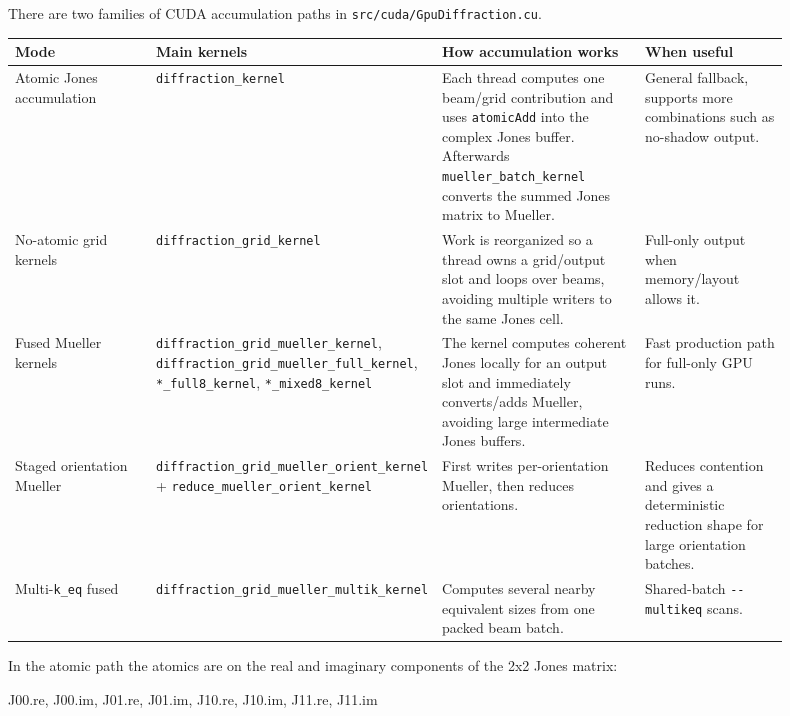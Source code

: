 \documentclass[
  10pt,
  a4paper,
]{article}
\newenvironment{Shaded}{}{}
\newcommand{\NormalTok}[1]{#1}
\begin{document}
There are two families of CUDA accumulation paths in
\texttt{src/cuda/GpuDiffraction.cu}.

\begin{longtable}[]{@{}L{0.20\linewidth}L{0.22\linewidth}L{0.28\linewidth}L{0.20\linewidth}@{}}
\toprule\noalign{}
Mode & Main kernels & How accumulation works & When useful \\
\midrule\noalign{}
\endhead
\bottomrule\noalign{}
\endlastfoot
Atomic Jones accumulation & \nolinkurl{diffraction_kernel} & Each thread
computes one beam/grid contribution and uses \texttt{atomicAdd} into the
complex Jones buffer. Afterwards \nolinkurl{mueller_batch_kernel}
converts the summed Jones matrix to Mueller. & General fallback,
supports more combinations such as no-shadow output. \\
No-atomic grid kernels & \nolinkurl{diffraction_grid_kernel} & Work is
reorganized so a thread owns a grid/output slot and loops over beams,
avoiding multiple writers to the same Jones cell. & Full-only output
when memory/layout allows it. \\
Fused Mueller kernels & \nolinkurl{diffraction_grid_mueller_kernel},
\nolinkurl{diffraction_grid_mueller_full_kernel},
\nolinkurl{*_full8_kernel}, \nolinkurl{*_mixed8_kernel} & The kernel
computes coherent Jones locally for an output slot and immediately
converts/adds Mueller, avoiding large intermediate Jones buffers. & Fast
production path for full-only GPU runs. \\
Staged orientation Mueller &
\nolinkurl{diffraction_grid_mueller_orient_kernel} +
\nolinkurl{reduce_mueller_orient_kernel} & First writes per-orientation
Mueller, then reduces orientations. & Reduces contention and gives a
deterministic reduction shape for large orientation batches. \\
Multi-\texttt{k\_eq} fused &
\nolinkurl{diffraction_grid_mueller_multik_kernel} & Computes several
nearby equivalent sizes from one packed beam batch. & Shared-batch
\texttt{-\/-multikeq} scans. \\
\end{longtable}

In the atomic path the atomics are on the real and imaginary components
of the 2x2 Jones matrix:

\begin{Shaded}
\begin{Highlighting}[]
\NormalTok{J00.re, J00.im, J01.re, J01.im,}
\NormalTok{J10.re, J10.im, J11.re, J11.im}
\end{Highlighting}
\end{Shaded}
\end{document}
